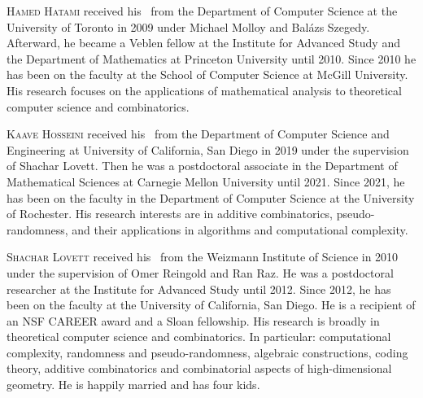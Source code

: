 \documentclass{toc}
\begin{document}
%
%
%
%
%
%
%
%
%
%
%
%
%
%
\begin{tocaboutauthors}
\begin{tocabout}[hatami]  %
\textsc{Hamed Hatami} 
  received his \phd\ from the Department of Computer Science at the University of Toronto in 2009 under %
%
Michael Molloy and Bal{\'a}zs Szegedy. Afterward, he became a Veblen fellow at the Institute for Advanced
%
Study  %
and the Department of Mathematics at Princeton University until 2010. Since 2010 he has been %
on the %
faculty at the School of Computer Science at McGill University. His research focuses on the applications of mathematical analysis to theoretical computer science and combinatorics.  
\end{tocabout}


\begin{tocabout}[hosseini]
\textsc{Kaave Hosseini} received his \phd\ from the
Department of Computer Science and Engineering at University of California, San Diego in 2019 under the supervision of
Shachar Lovett. Then he was a  postdoctoral associate in the Department of Mathematical Sciences at Carnegie Mellon University until 2021. Since 2021, he has been %
on the %
%
faculty in the Department of Computer Science at
the  %
University of Rochester. His research interests are in additive combinatorics, pseudo-randomness, and their applications in algorithms and computational complexity.
\end{tocabout}

\begin{tocabout}[lovett]
\textsc{Shachar Lovett} received his \phd\ from the
Weizmann Institute of Science in 2010 under the supervision of
Omer Reingold and Ran Raz. He was a postdoctoral researcher at
the Institute for Advanced Study until 2012. Since 2012, he has been
%
on the  %
faculty at the University of California, San Diego. He is a
recipient of an NSF CAREER award and a Sloan fellowship.
His research is broadly in theoretical computer science and
combinatorics. In particular: computational complexity, randomness and
pseudo-randomness,
algebraic constructions, coding theory, additive combinatorics and
combinatorial aspects of high-dimensional geometry.
He is happily married and has four kids.
\end{tocabout}

\end{tocaboutauthors}
\end{document}

